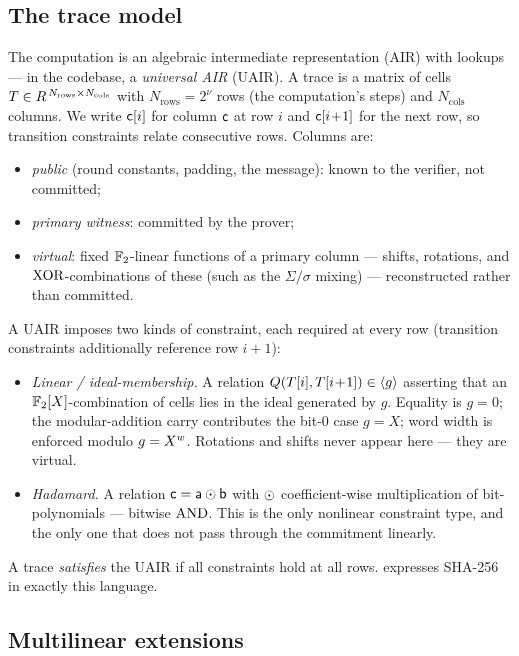 \subsection{The trace model}
\label{sec:trace}

The computation is an algebraic intermediate representation (AIR) with lookups
--- in the codebase, a \emph{universal AIR} (UAIR). A trace is a matrix of cells
$T \in R^{\,N_{\mathrm{rows}}\times N_{\mathrm{cols}}}$ with
$N_{\mathrm{rows}} = 2^{\nu}$ rows (the computation's steps) and
$N_{\mathrm{cols}}$ columns. We write $\mathsf{c}[i]$ for column $\mathsf{c}$ at row
$i$ and $\mathsf{c}[i\!+\!1]$ for the next row, so transition constraints relate
consecutive rows. Columns are:
\begin{itemize}[leftmargin=2em]
  \item \emph{public} (round constants, padding, the message): known to the
    verifier, not committed;
  \item \emph{primary witness}: committed by the prover;
  \item \emph{virtual}: fixed $\mathbb{F}_2$-linear functions of a primary column ---
    shifts, rotations, and $\operatorname{XOR}$-combinations of these (such as the
    $\Sigma/\sigma$ mixing) --- reconstructed rather than committed.
\end{itemize}
A UAIR imposes two kinds of constraint, each required at every row (transition
constraints additionally reference row $i\!+\!1$):
\begin{itemize}[leftmargin=2em]
  \item \emph{Linear / ideal-membership.} A relation
    $Q(T[i],T[i\!+\!1]) \in \langle g \rangle$ asserting that an $\mathbb{F}_2[X]$-combination
    of cells lies in the ideal generated by $g$. Equality is $g = 0$; the
    modular-addition carry contributes the bit-$0$ case $g = X$; word width is
    enforced modulo $g = X^{w}$. Rotations and shifts never appear here ---
    they are virtual.
  \item \emph{Hadamard.} A relation $\mathsf{c} = \mathsf{a}\odot\mathsf{b}$ with $\odot$
    coefficient-wise multiplication of bit-polynomials --- bitwise $\operatorname{AND}$. This
    is the only nonlinear constraint type, and the only one that does not pass
    through the commitment linearly.
\end{itemize}
A trace \emph{satisfies} the UAIR if all constraints hold at all rows.
 expresses SHA-256 in exactly this language.

\subsection{Multilinear extensions}

